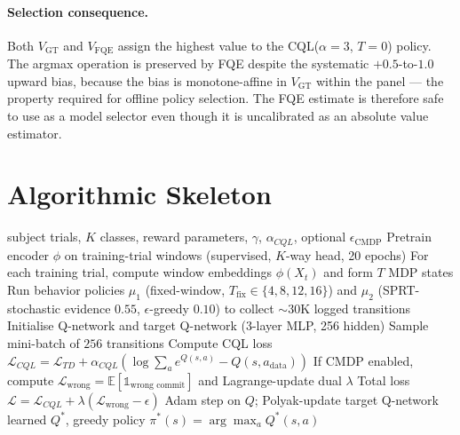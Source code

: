 \documentclass[conference]{IEEEtran}
\newcommand{\nettype}{NeuroPolicy}
\newcommand{\cql}{CQL}
\newcommand{\fqe}{FQE}
\begin{document}
\paragraph{Selection consequence.}
Both $V_{\text{GT}}$ and $V_{\text{FQE}}$ assign the highest value
to the \cql{}($\alpha\!=\!3$, $T\!=\!0$) policy. The argmax
operation is preserved by \fqe{} despite the systematic $+0.5$-to-$1.0$
upward bias, because the bias is monotone-affine in $V_{\text{GT}}$
within the panel --- the property required for offline policy
selection. The \fqe{} estimate is therefore safe to use as a model
selector even though it is uncalibrated as an absolute value
estimator.

\section{Algorithmic Skeleton}

\begin{algorithm}[h]
\caption{\nettype{} training (within-subject)}
\label{alg:np_train}
\begin{algorithmic}[1]
\Require subject trials, $K$ classes, reward parameters, $\gamma$,
$\alpha_{\cql}$, optional $\epsilon_{\text{CMDP}}$
\State Pretrain encoder $\phi$ on training-trial windows
       (supervised, $K$-way head, 20 epochs)
\State For each training trial, compute window embeddings
       $\phi(X_t)$ and form $T$ MDP states
\State Run behavior policies $\mu_1$ (fixed-window, $T_{\text{fix}}
       \in \{4, 8, 12, 16\}$) and $\mu_2$ (SPRT-stochastic
       evidence $0.55$, $\epsilon$-greedy $0.10$) to collect
       $\sim$30K logged transitions
\State Initialise Q-network and target Q-network (3-layer MLP,
       256 hidden)
  \State Sample mini-batch of $256$ transitions
  \State Compute \cql{} loss $\mathcal{L}_{\cql} =
         \mathcal{L}_{TD} + \alpha_{\cql}(\log\sum_a e^{Q(s,a)} -
         Q(s, a_{\text{data}}))$
  \State If CMDP enabled, compute
         $\mathcal{L}_{\text{wrong}} = \mathbb{E}[\mathbb{1}_{\text{wrong commit}}]$
         and Lagrange-update dual $\lambda$
  \State Total loss
         $\mathcal{L} = \mathcal{L}_{\cql} + \lambda(\mathcal{L}_{\text{wrong}} - \epsilon)$
  \State Adam step on $Q$; Polyak-update target Q-network
\EndFor
\State \Return learned $Q^*$, greedy policy
       $\pi^*(s) = \arg\max_a Q^*(s, a)$
\end{algorithmic}
\end{algorithm}
\end{document}
